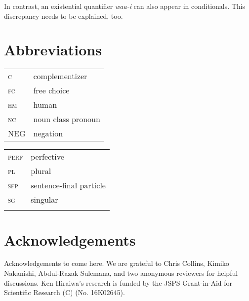 \documentclass[output=paper,colorlinks,citecolor=brown]{langscibook}
\begin{document}
\z
In contrast, an existential quantifier \textit{waa-i} can also appear in conditionals. This discrepancy needs to be explained, too.


\z


\section*{Abbreviations}
\begin{tabularx}{.45\textwidth}{lQ}
\textsc{c} & complementizer\\
 \textsc{fc} & free choice\\
 \textsc{hm} & human\\
 \textsc{nc} & noun class pronoun\\
 NEG & negation
 \end{tabularx}
\begin{tabularx}{.45\textwidth}{lQ}
 \textsc{perf} & perfective\\
 \textsc{pl} & plural\\
 \textsc{sfp} & sentence-final particle\\
 \textsc{sg} & singular\\
 \\
 \end{tabularx}

\section*{Acknowledgements}
Acknowledgements to come here. We are grateful to Chris Collins, Kimiko Nakanishi,  Abdul-Razak Sulemana, and two anonymous reviewers for helpful discussions.
Ken Hiraiwa's research is funded by the JSPS Grant-in-Aid for Scientific Research (C) (No. 16K02645).

\printbibliography[heading=subbibliography,notkeyword=this]
\end{document}
